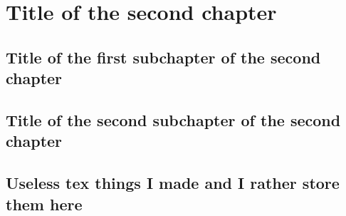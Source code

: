 \chapter{Title of the second chapter}

\section{Title of the first subchapter of the second chapter}

\section{Title of the second subchapter of the second chapter}

\section{Useless tex things I made and I rather store them here}
